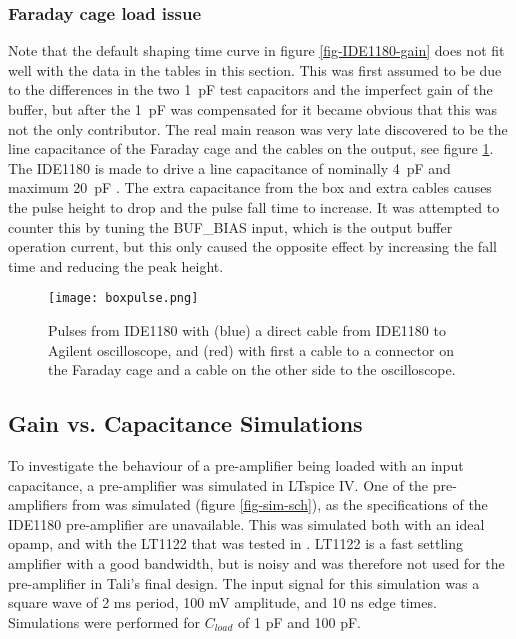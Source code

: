 \documentclass[../main/thesis.tex]{subfiles}
\begin{document}
\subsubsection{Faraday cage load issue}
Note that the default shaping time curve in figure \ref{fig-IDE1180-gain} does not fit well with the data in the tables in this section. This was first assumed to be due to the differences in the two 1~pF test capacitors and the imperfect gain of the buffer, but after the 1~pF was compensated for it became obvious that this was not the only contributor. The real main reason was very late discovered to be the line capacitance of the Faraday cage and the cables on the output, see figure \ref{fig-box-pulse}. The IDE1180 is made to drive a line capacitance of nominally 4~pF and maximum 20~pF \citep{IDE1180}. The extra capacitance from the box and extra cables causes the pulse height to drop and the pulse fall time to increase. It was attempted to counter this by tuning the BUF\_BIAS input, which is the output buffer operation current, but this only caused the opposite effect by increasing the fall time and reducing the peak height. 


\begin{figure}[h]
	\centering
	\texttt{[image: boxpulse.png]}
	\caption{Pulses from IDE1180 with (blue) a direct cable from IDE1180 to Agilent oscilloscope, and (red) with first a cable to a connector on the Faraday cage and a cable on the other side to the oscilloscope.}
	\label{fig-box-pulse}
\end{figure} 

\newpage
\subsection{Gain vs. Capacitance Simulations}

To investigate the behaviour of a pre-amplifier being loaded with an input capacitance, a pre-amplifier was simulated in LTspice IV. One of the pre-amplifiers from \citep{tali} was simulated (figure \ref{fig-sim-sch}), as the specifications of the IDE1180 pre-amplifier are unavailable. This was simulated both with an ideal \gls{opamp}, and with the LT1122 that was tested in \citep{tali}. LT1122 is a fast settling amplifier with a good bandwidth, but is noisy and was therefore not used for the pre-amplifier in Tali's final design. The input signal for this simulation was a square wave of 2 ms period, 100 mV amplitude, and 10 ns edge times. Simulations were performed for $C_{load}$ of 1 pF and 100 pF.  
\end{document}
